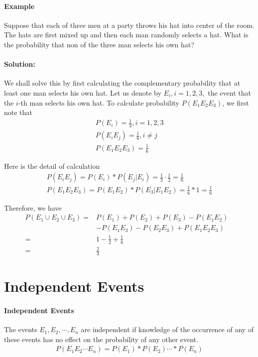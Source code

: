 \documentclass[10 pt,final]{article}
\newcommand{\impo}[1]{{\color{magenta} #1}}
\begin{document}
\paragraph{\impo{Example}} Suppose that each of three men at a party throws his hat into center of the room. The hats are first mixed up and then each man randomly selects a hat. What is the probability that non of the three man selects his own hat?

\paragraph{Solution:} We shall solve this by first calculating the complementary probability that at least one man selects his own hat. Let us denote by $E_i, i =1,2,3,$ the event that the $i$-th man selects his own hat. To calculate probability $P(E_1 E_2 E_3)$, we first note that 
\begin{align*}
P(E_i) = \frac{1}{3}, i= 1,2,3 \\
P(E_i E_j) = \frac{1}{6}, i \neq j \\
P(E_1 E_2 E_3) = \frac{1}{6} 
\end{align*}

Here is the detail of calculation
\begin{align*}
P(E_i E_j) = P(E_i) * P(E_j | E_i) = \frac{1}{3} \cdot \frac{1}{2} = \frac{1}{6} \\
P(E_1 E_2 E_3) = P(E_1 E_2) *P(E_3 | E_1 E_2) = \frac{1}{6}*1 = \frac{1}{6}
\end{align*}

\impo{Therefore, we have}
\begin{align*}
P(E_1 \cup E_2 \cup E_3) = & P(E_1) + P(E_2) + P(E_3) - P(E_1 E_2) & \\
& - P(E_1 E_3) - P(E_2 E_3) + P(E_1 E_2 E_3) &\\
= & 1 - \frac{1}{2} + \frac{1}{6} & \\
= & \frac{2}{3} &
\end{align*}
\section{Independent Events}
\paragraph{Independent Events} The events $E_1, E_2, \cdots, E_n$ are independent if knowledge of the occurrence of any of these events has no effect on the probability of any other event.
\begin{align*}
P(E_1 E_2 \cdots E_n) = P(E_1) * P(E_2) \cdots * P(E_n)
\end{align*}
\end{document}
